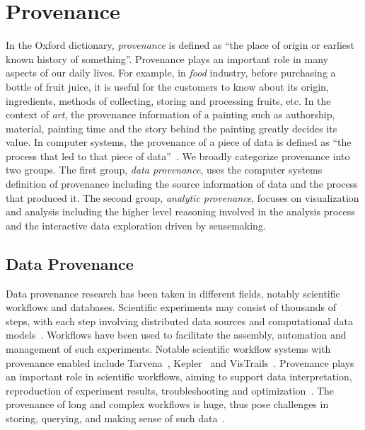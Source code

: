 \section{Provenance}
In the Oxford dictionary, \emph{provenance} is defined as ``the place of origin or earliest known history of something''. Provenance plays an important role in many aspects of our daily lives. For example, in \emph{food} industry, before purchasing a bottle of fruit juice, it is useful for the customers to know about its origin, ingredients, methods of collecting, storing and processing fruits, etc. In the context of \emph{art}, the provenance information of a painting such as authorship, material, painting time and the story behind the painting greatly decides its value. In computer systems, the provenance of a piece of data is defined as ``the process that led to that piece of data''~\cite{Moreau2011}. We broadly categorize provenance into two groups. The first group, \emph{data provenance}, uses the computer systems definition of provenance including the source information of data and the process that produced it. The second group, \emph{analytic provenance}, focuses on visualization and analysis including the higher level reasoning involved in the analysis process and the interactive data exploration driven by sensemaking.

\subsection{Data Provenance}
\label{sub:lr-data-provenane}
Data provenance research has been taken in different fields, notably scientific workflows and databases. Scientific experiments may consist of thousands of steps, with each step involving distributed data sources and computational data models~\cite{Gil2007}. Workflows have been used to facilitate the assembly, automation and management of such experiments. Notable scientific workflow systems with provenance enabled include Tarvena~\cite{Zhao2008}, Kepler~\cite{Bowers2006} and VisTrails~\cite{Bavoil2005}. Provenance plays an important role in scientific workflows, aiming to support data interpretation, reproduction of experiment results, troubleshooting and optimization~\cite{Miles2007}. The provenance of long and complex workflows is huge, thus pose challenges in storing, querying, and making sense of such data~\cite{Davidson2007}.

